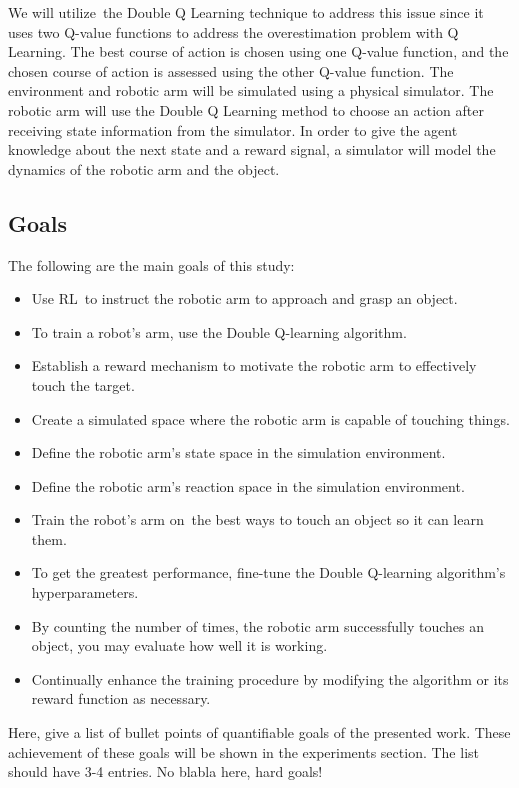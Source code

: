 \documentclass[12pt,oneside]{article}
\begin{document}
We will utilize the Double Q Learning technique to address this issue since it uses two Q-value functions to address the overestimation problem with Q Learning. The best course of action is chosen using one Q-value function, and the chosen course of action is assessed using the other Q-value function. The environment and robotic arm will be simulated using a physical simulator. The robotic arm will use the Double Q Learning method to choose an action after receiving state information from the simulator. In order to give the agent knowledge about the next state and a reward signal, a simulator will model the dynamics of the robotic arm and the object.

%
\subsection{Goals}\label{sec:ziele}
The following are the main goals of this study:
\begin{itemize}
\item Use RL to instruct the robotic arm to approach and grasp an object.
\item To train a robot's arm, use the Double Q-learning algorithm.
\item Establish a reward mechanism to motivate the robotic arm to effectively touch the target.
\item Create a simulated space where the robotic arm is capable of touching things.
\item Define the robotic arm's state space in the simulation environment.
\item Define the robotic arm's reaction space in the simulation environment.
\item Train the robot's arm on the best ways to touch an object so it can learn them.
\item To get the greatest performance, fine-tune the Double Q-learning algorithm's hyperparameters.
\item By counting the number of times, the robotic arm successfully touches an object, you may evaluate how well it is working.
\item Continually enhance the training procedure by modifying the algorithm or its reward function as necessary.

\end{itemize}

Here, give a list of bullet points of quantifiable goals of the presented work. These achievement of these goals will be shown in the experiments section. The list should have 3-4 entries. No blabla here, hard goals!
%
\end{document}
